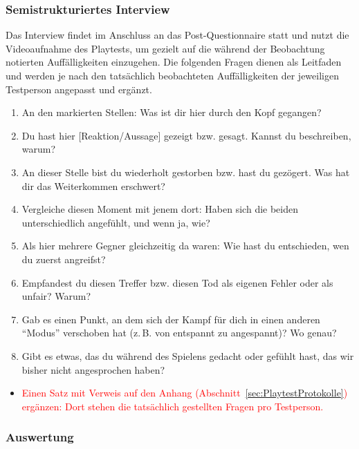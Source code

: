 \documentclass[../Main.tex]{subfiles}
\begin{document}
\subsubsection{Semistrukturiertes Interview} \label{sec:Interview}

Das Interview findet im Anschluss an das Post-Questionnaire statt und nutzt die Videoaufnahme des Playtests, um gezielt auf die während der Beobachtung notierten Auffälligkeiten einzugehen. Die folgenden Fragen dienen als Leitfaden und werden je nach den tatsächlich beobachteten Auffälligkeiten der jeweiligen Testperson angepasst und ergänzt.

\begin{enumerate}[label=\textbf{I\arabic*}, leftmargin=1.5cm, itemsep=0.5em]
    \item An den markierten Stellen: Was ist dir hier durch den Kopf gegangen?
    \item Du hast hier [Reaktion/Aussage] gezeigt bzw. gesagt. Kannst du beschreiben, warum?
    \item An dieser Stelle bist du wiederholt gestorben bzw. hast du gezögert. Was hat dir das Weiterkommen erschwert?
    \item Vergleiche diesen Moment mit jenem dort: Haben sich die beiden unterschiedlich angefühlt, und wenn ja, wie?
    \item Als hier mehrere Gegner gleichzeitig da waren: Wie hast du entschieden, wen du zuerst angreifst?
    \item Empfandest du diesen Treffer bzw. diesen Tod als eigenen Fehler oder als unfair? Warum?
    \item Gab es einen Punkt, an dem sich der Kampf für dich in einen anderen \enquote{Modus} verschoben hat (z.\,B. von entspannt zu angespannt)? Wo genau?
    \item Gibt es etwas, das du während des Spielens gedacht oder gefühlt hast, das wir bisher nicht angesprochen haben?
\end{enumerate}

\begin{itemize}[leftmargin=1.5cm]
    \item \textcolor{red}{Einen Satz mit Verweis auf den Anhang (Abschnitt~\ref{sec:PlaytestProtokolle}) ergänzen: Dort stehen die tatsächlich gestellten Fragen pro Testperson.}
\end{itemize}

\subsubsection{Auswertung} \label{sec:Auswertung}
\end{document}
